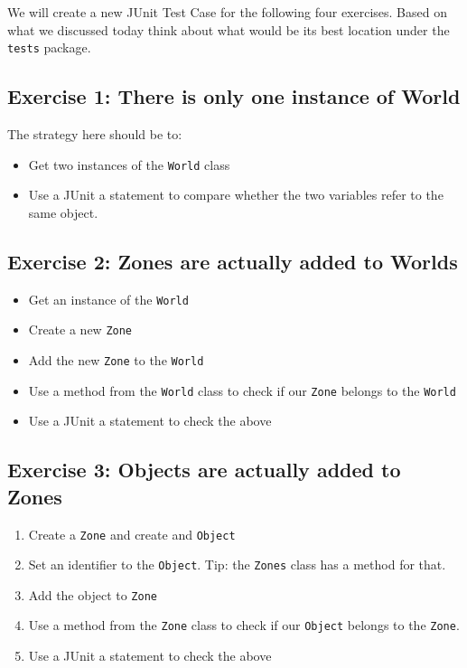 \documentclass[
]{book}
\providecommand{\tightlist}{%
  \setlength{\itemsep}{0pt}\setlength{\parskip}{0pt}}
\begin{document}
We will create a new JUnit Test Case for the following four exercises. Based on what we discussed today think about what would be its best location under the \texttt{tests} package.

\hypertarget{exercise-1-there-is-only-one-instance-of-world}{%
\subsection{Exercise 1: There is only one instance of World}\label{exercise-1-there-is-only-one-instance-of-world}}

The strategy here should be to:

\begin{itemize}
\tightlist
\item
  Get two instances of the \texttt{World} class
\item
  Use a JUnit a statement to compare whether the two variables refer to the same object.
\end{itemize}

\hypertarget{exercise-2-zones-are-actually-added-to-worlds}{%
\subsection{Exercise 2: Zones are actually added to Worlds}\label{exercise-2-zones-are-actually-added-to-worlds}}

\begin{itemize}
\tightlist
\item
  Get an instance of the \texttt{World}
\item
  Create a new \texttt{Zone}
\item
  Add the new \texttt{Zone} to the \texttt{World}
\item
  Use a method from the \texttt{World} class to check if our \texttt{Zone} belongs to the \texttt{World}
\item
  Use a JUnit a statement to check the above
\end{itemize}

\hypertarget{exercise-3-objects-are-actually-added-to-zones}{%
\subsection{Exercise 3: Objects are actually added to Zones}\label{exercise-3-objects-are-actually-added-to-zones}}

\begin{enumerate}
\def\labelenumi{\arabic{enumi}.}
\tightlist
\item
  Create a \texttt{Zone} and create and \texttt{Object}
\item
  Set an identifier to the \texttt{Object}. Tip: the \texttt{Zones} class has a method for that.
\item
  Add the object to \texttt{Zone}
\item
  Use a method from the \texttt{Zone} class to check if our \texttt{Object} belongs to the \texttt{Zone}.
\item
  Use a JUnit a statement to check the above\\
\end{enumerate}
\end{document}

